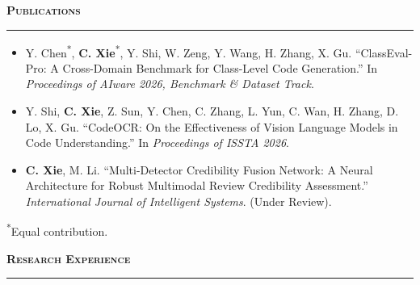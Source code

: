 \documentclass[11pt,letterpaper]{article}
\newcommand{\cvsection}[1]{%
  \vspace{10pt} 
  {\noindent\Large\bfseries\scshape #1} 
  \par           
  \vspace{2pt}   
  \hrule         
  \vspace{6pt}   
}
\begin{document}
\cvsection{Publications}

\begin{itemize}
    \item Y. Chen\textsuperscript{*}, \textbf{C. Xie}\textsuperscript{*}, Y. Shi, W. Zeng, Y. Wang, H. Zhang, X. Gu. ``ClassEval-Pro: A Cross-Domain Benchmark for Class-Level Code Generation.'' In \emph{Proceedings of AIware 2026, Benchmark \& Dataset Track}. 
    \item Y. Shi, \textbf{C. Xie}, Z. Sun, Y. Chen, C. Zhang, L. Yun, C. Wan, H. Zhang, D. Lo, X. Gu. ``CodeOCR: On the Effectiveness of Vision Language Models in Code Understanding.'' In \emph{Proceedings of ISSTA 2026}.
    \item \textbf{C. Xie}, M. Li. ``Multi-Detector Credibility Fusion Network: A Neural Architecture for Robust Multimodal Review Credibility Assessment.'' \emph{International Journal of Intelligent Systems}. (Under Review).
\end{itemize}
\vspace{-0.6em}
{\footnotesize \noindent\textsuperscript{*}Equal contribution.}

\cvsection{Research Experience}
\end{document}
